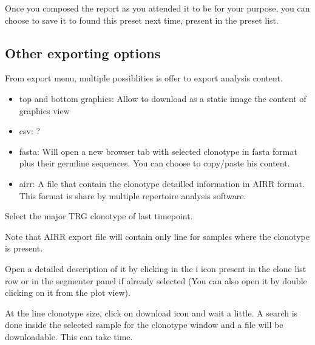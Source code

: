Once you composed the report as you attended it to be for your purpose, you can choose to save it to found this preset next time, present in the preset list.

\subsection{Other exporting options}

From export menu, multiple possiblities is offer to export analysis content.
\begin{itemize}
  \item top and bottom graphics: Allow to download as a static image the content of graphics view
  \item csv:  ? %
  \item fasta: Will open a new browser tab with selected clonotype in fasta format plus their germline sequences. You can choose to copy/paste his content.
  \item airr: A file that contain the clonotype detailled information in AIRR format. This format is share by multiple repertoire analysis software. 
\end{itemize}

Select the major TRG clonotype of last timepoint.

Note that AIRR export file will contain only line for samples where the clonotype is present.



Open a detailed description of it by clicking in the {i icon} present in the clone list row or in the segmenter panel if already selected (You can also open it by double clicking on it from the plot view).

At the line clonotype size, click on download icon and wait a little. 
A search is done inside the selected sample for the clonotype window and a file will be downloadable. 
This can take time. 
